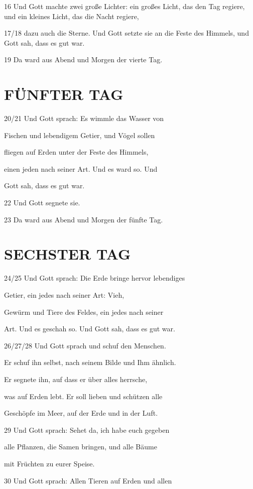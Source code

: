 \documentclass[11pt,a5paper,twoside]{article}
\begin{document}
16 Und Gott machte zwei große Lichter: ein großes
Licht, das den Tag regiere, und ein kleines Licht,
das die Nacht regiere,

17/18 dazu auch die Sterne. Und Gott setzte sie an
die Feste des Himmels, und Gott sah, dass es gut
war.

19 Da ward aus Abend und Morgen der vierte Tag.

\section[Fünfter Tag]{FÜNFTER TAG}

20/21 Und Gott sprach: Es wimmle das Wasser von

Fischen und lebendigem Getier, und Vögel sollen

fliegen auf Erden unter der Feste des Himmels,

einen jeden nach seiner Art. Und es ward so. Und

Gott sah, dass es gut war.

22 Und Gott segnete sie.

23 Da ward aus Abend und Morgen der fünfte Tag.

\section[Sechster Tag]{SECHSTER TAG}

24/25 Und Gott sprach: Die Erde bringe hervor lebendiges

Getier, ein jedes nach seiner Art: Vieh,

Gewürm und Tiere des Feldes, ein jedes nach seiner

Art. Und es geschah so. Und Gott sah, dass es
gut war.

26/27/28 Und Gott sprach und schuf den Menschen.

Er schuf ihn selbst, nach seinem Bilde und Ihm ähnlich.

Er segnete ihn, auf dass er über alles herrsche,

was auf Erden lebt. Er soll lieben und schützen alle

Geschöpfe im Meer, auf der Erde und in der Luft.

29 Und Gott sprach: Sehet da, ich habe euch gegeben

alle Pflanzen, die Samen bringen, und alle Bäume

mit Früchten zu eurer Speise.

30 Und Gott sprach: Allen Tieren auf Erden und allen
\end{document}
